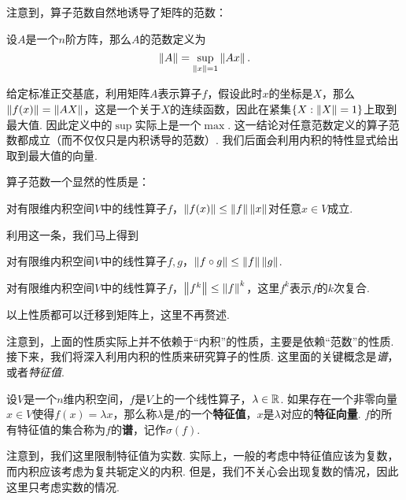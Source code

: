 注意到，算子范数自然地诱导了矩阵的范数：
\begin{definition}[矩阵范数]
    设$A$是一个$n$阶方阵，那么$A$的范数定义为
    \[\left\|A\right\|=\sup_{\left\|x\right\|=1}\left\|Ax\right\|.\]
\end{definition}

给定标准正交基底，利用矩阵$A$表示算子$f$，假设此时$x$的坐标是$X$，那么$\left\|f(x)\right\|=\left\|AX\right\|$，这是一个关于$X$的连续函数，因此在紧集$\{X:\left\|X\right\|=1\}$上取到最大值. 因此定义中的$\sup$实际上是一个$\max$. 这一结论对任意范数定义的算子范数都成立（而不仅仅只是内积诱导的范数）. 我们后面会利用内积的特性显式给出取到最大值的向量. 

算子范数一个显然的性质是：

\begin{proposition}\label{prop:norm-ineq}
对有限维内积空间$V$中的线性算子$f$，$\left\|f(x)\right\|\leq \left\|f\right\|\left\|x\right\|$对任意$x\in V$成立. 
\end{proposition}

利用这一条，我们马上得到

\begin{proposition}\label{prop:operator-norm-ineq}
对有限维内积空间$V$中的线性算子$f,g$，$\left\|f\circ g\right\|\leq \left\|f\right\|\left\|g\right\|$.
\end{proposition}

\begin{proposition}\label{prop:operator-power-norm-ineq}
    对有限维内积空间$V$中的线性算子$f$，$\left\|f^k\right\|\leq \left\|f\right\|^k$，这里$f^k$表示$f$的$k$次复合. 
\end{proposition}

以上性质都可以迁移到矩阵上，这里不再赘述. 

注意到，上面的性质实际上并不依赖于“内积”的性质，主要是依赖“范数”的性质. 接下来，我们将深入利用内积的性质来研究算子的性质. 这里面的关键概念是\emph{谱}，或者\emph{特征值}. 

\begin{definition}
设$V$是一个$n$维内积空间，$f$是$V$上的一个线性算子，$\lambda\in\mathbb{R}$. 如果存在一个非零向量$x\in V$使得$f(x)=\lambda x$，那么称$\lambda$是$f$的一个\textbf{特征值}，$x$是$\lambda$对应的\textbf{特征向量}. $f$的所有特征值的集合称为$f$的\textbf{谱}，记作$\sigma(f)$. 
\end{definition}

注意到，我们这里限制特征值为实数. 实际上，一般的考虑中特征值应该为复数，而内积应该考虑为复共轭定义的内积. 但是，我们不关心会出现复数的情况，因此这里只考虑实数的情况. 

